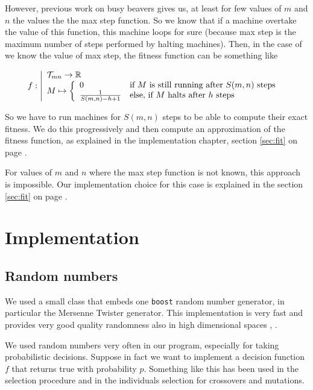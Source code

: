 \documentclass{report}
\begin{document}
However, previous work on busy beavers \cite{rado} \cite{allen} gives us, at least for few values of $m$ and $n$ the values the the max step function. So we know that if a machine overtake the value of this function, this machine loops for sure (because max step is the maximum number of steps performed by halting machines). Then, in the case of we know the value of max step, the fitness function can be something like

\[
f : \left |
  \begin{array}{l}
    \mathcal{T}_{mn} \to \mathbb{R}\\
    M  \mapsto \left \{
  \begin{array}{ll}
    0&\text{if } M \text{ is still running after } S(m,n) \text{ steps}\\
    \frac{1}{S(m,n) - h + 1}&\text{else, if } M \text{ halts after } h \text{ steps}
  \end{array} \right .
  \end{array}
\right .
\]

So we have to run machines for $S(m,n)$ steps to be able to compute their exact fitness. We do this progressively and then compute an approximation of the fitness function, as explained in the implementation chapter, section \ref{sec:fit} on page \pageref{sec:fit}.

For values of $m$ and $n$ where the max step function is not known, this approach is impossible. Our implementation choice for this case is explained in the section \ref{sec:fit} on page \pageref{sec:fit}.

\chapter{Implementation}
\label{chap:impl}

\section{Random numbers}
\label{sec:random}
We used a small class that embeds one \texttt{boost} random number generator, in particular the Mersenne Twister generator. This implementation is very fast and provides very good quality randomness also in high dimensional spaces \cite{boost-random}, \cite{mersenne-twister}.

We used random numbers very often in our program, especially for taking probabilistic decisions. Suppose in fact we want to implement a decision function $f$ that returns true with probability $p$. Something like this has been used in the selection procedure and in the individuals selection for crossovers and mutations.
\end{document}
